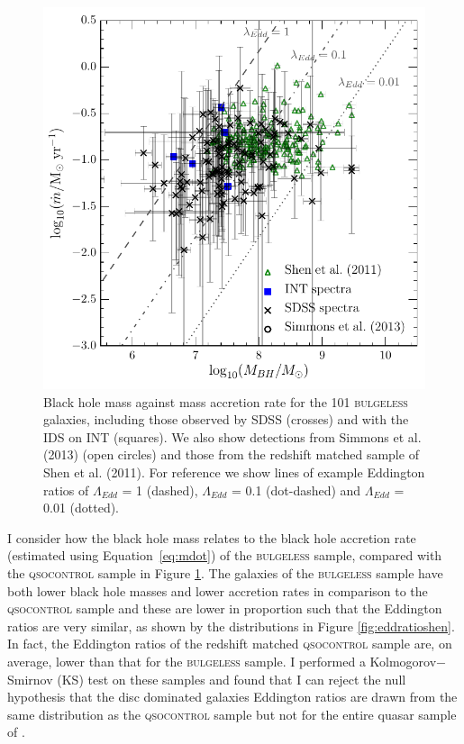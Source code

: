 {\begin{figure}
\centering
\includegraphics[width=\textwidth]{agn/mass_bh_mdot_with_all_errors_shen_11.pdf}
\caption[Black hole mass against mass accretion rate for the \textsc{bulgeless} sample]{Black hole mass against mass accretion rate for the 101 \textsc{bulgeless} galaxies, including those observed by SDSS (crosses) and with the IDS on INT (squares). We also show detections from {\notebsm Simmons et al. (2013)} (open circles) and those from the redshift matched sample of {\notebsm Shen et al. (2011)}. For reference we show lines of example Eddington ratios of $\Lambda_{Edd}$ = 1 (dashed),  $\Lambda_{Edd}$ = 0.1 (dot-dashed) and $\Lambda_{Edd}$ = 0.01 (dotted).
}
\label{fig:mbhvsbol}
\end{figure}


I consider how the black hole mass relates to the black hole accretion rate (estimated using Equation~\ref{eq:mdot}) of the \textsc{bulgeless} sample, compared with the \textsc{qsocontrol} sample in Figure \ref{fig:mbhvsbol}. The galaxies of the \textsc{bulgeless} sample have both lower black hole masses and lower accretion rates in comparison to the \textsc{qsocontrol} sample and these are lower in proportion such that the Eddington ratios are very similar, as shown by the distributions in Figure \ref{fig:eddratioshen}. In fact, the Eddington ratios of the redshift matched \textsc{qsocontrol} sample are, on average, lower than that for the \textsc{bulgeless} sample. I performed a Kolmogorov$-$Smirnov (KS) test on these samples and found that I can reject the null hypothesis that the disc dominated galaxies Eddington ratios are drawn from the same distribution as the \textsc{qsocontrol} sample but not for the entire quasar sample of \citet{shen11}.

}
